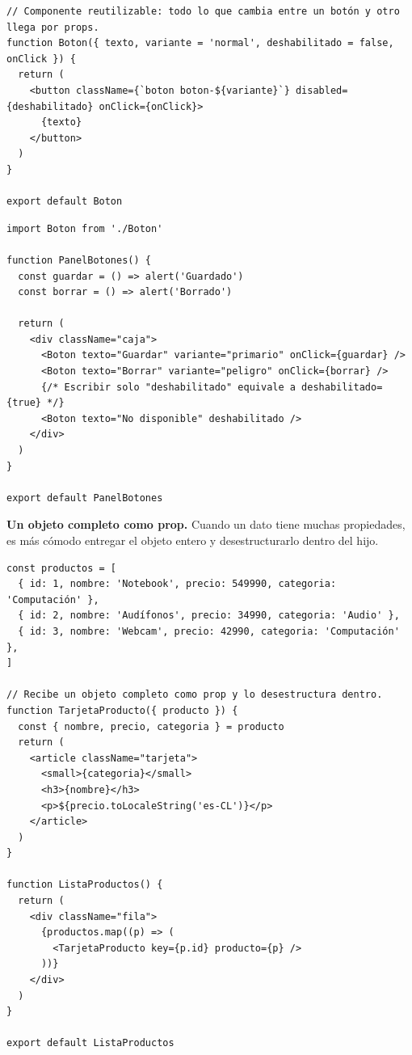 \documentclass[11pt,a4paper]{article}
\begin{document}
\begin{lstlisting}[language=JSX,title={\small\ttfamily src/components/props/Boton.jsx}]
// Componente reutilizable: todo lo que cambia entre un botón y otro llega por props.
function Boton({ texto, variante = 'normal', deshabilitado = false, onClick }) {
  return (
    <button className={`boton boton-${variante}`} disabled={deshabilitado} onClick={onClick}>
      {texto}
    </button>
  )
}

export default Boton
\end{lstlisting}
\begin{lstlisting}[language=JSX,title={\small\ttfamily src/components/props/PanelBotones.jsx}]
import Boton from './Boton'

function PanelBotones() {
  const guardar = () => alert('Guardado')
  const borrar = () => alert('Borrado')

  return (
    <div className="caja">
      <Boton texto="Guardar" variante="primario" onClick={guardar} />
      <Boton texto="Borrar" variante="peligro" onClick={borrar} />
      {/* Escribir solo "deshabilitado" equivale a deshabilitado={true} */}
      <Boton texto="No disponible" deshabilitado />
    </div>
  )
}

export default PanelBotones
\end{lstlisting}

\textbf{Un objeto completo como prop.} Cuando un dato tiene muchas propiedades, es más cómodo entregar el objeto entero y desestructurarlo dentro del hijo.

\begin{lstlisting}[language=JSX,title={\small\ttfamily src/components/props/ListaProductos.jsx}]
const productos = [
  { id: 1, nombre: 'Notebook', precio: 549990, categoria: 'Computación' },
  { id: 2, nombre: 'Audífonos', precio: 34990, categoria: 'Audio' },
  { id: 3, nombre: 'Webcam', precio: 42990, categoria: 'Computación' },
]

// Recibe un objeto completo como prop y lo desestructura dentro.
function TarjetaProducto({ producto }) {
  const { nombre, precio, categoria } = producto
  return (
    <article className="tarjeta">
      <small>{categoria}</small>
      <h3>{nombre}</h3>
      <p>${precio.toLocaleString('es-CL')}</p>
    </article>
  )
}

function ListaProductos() {
  return (
    <div className="fila">
      {productos.map((p) => (
        <TarjetaProducto key={p.id} producto={p} />
      ))}
    </div>
  )
}

export default ListaProductos
\end{lstlisting}
\end{document}
